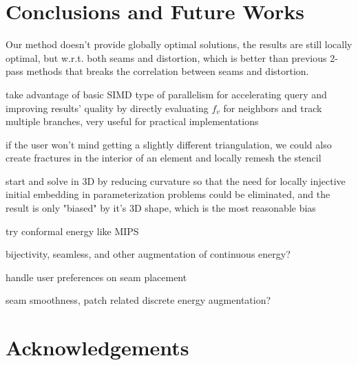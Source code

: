 \section{Conclusions and Future Works}

Our method doesn't provide globally optimal solutions, the results are still locally optimal, but w.r.t. both seams and distortion, which is better than previous 2-pass methods that breaks the correlation between seams and distortion.

take advantage of basic SIMD type of parallelism for accelerating query and improving results' quality by directly evaluating $f_v$ for neighbors and track multiple branches, very useful for practical implementations

if the user won't mind getting a slightly different triangulation, we could also create fractures in the interior of an element and locally remesh the stencil

start and solve in 3D by reducing curvature so that the need for locally injective initial embedding in parameterization problems could be eliminated, and the result is only "biased" by it's 3D shape, which is the most reasonable bias

try conformal energy like MIPS

bijectivity, seamless, and other augmentation of continuous energy?

handle user preferences on seam placement

seam smoothness, patch related discrete energy augmentation?

\section{Acknowledgements}